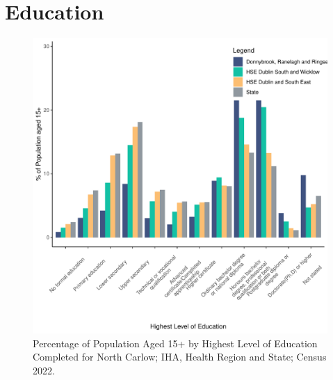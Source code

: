 \documentclass{article}
\begin{document}
\section{Education}\label{sect:Edu}
\begin{figure}[H]
	\centering
	\includegraphics[width = 120mm]{../figures/EduED.pdf}
	\caption{Percentage of Population Aged 15+ by Highest Level of Education Completed for North Carlow; IHA, Health Region and State; Census 2022.}
	\label{fig:vbnv}
	\end{figure}
\end{document}
